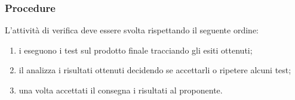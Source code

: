 	\subsubsection{Procedure}
	L'attività di verifica deve essere svolta rispettando il seguente ordine:
	\begin{enumerate}
		\item i \verificatori{} eseguono i test sul prodotto finale tracciando gli esiti ottenuti;
		\item il \responsabilediprogetto{} analizza i risultati ottenuti decidendo se accettarli o ripetere alcuni test;
		\item una volta accettati il \responsabilediprogetto{} consegna i risultati al proponente.
	\end{enumerate}	
